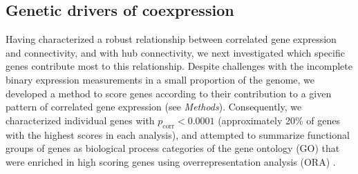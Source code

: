 \documentclass[10pt,letterpaper]{article}
\begin{document}
{\subsection*{Genetic drivers of coexpression}
Having characterized a robust relationship between correlated gene expression and connectivity, and with hub connectivity, we next investigated which specific genes contribute most to this relationship.
Despite challenges with the incomplete binary expression measurements in a small proportion of the genome, we developed a method to score genes according to their contribution to a given pattern of correlated gene expression (see \emph{Methods}).
Consequently, we characterized individual genes with $p_\mathrm{corr}<0.0001$ (approximately 20\% of genes with the highest scores in each analysis), and attempted to summarize functional groups of genes as biological process categories of the gene ontology (GO) that were enriched in high scoring genes using overrepresentation analysis (ORA) \cite{Ashburner2000, Gillis2010}.\\

}
\end{document}
